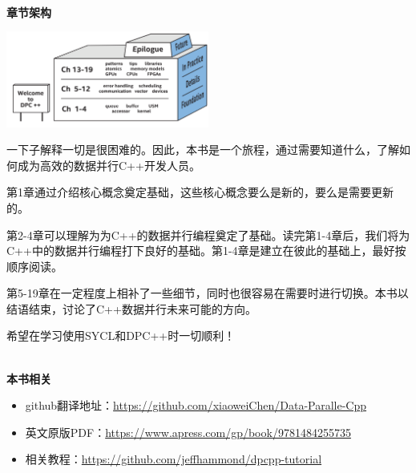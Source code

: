 \documentclass[11pt,a4paper,UTF8]{ctexart}
\begin{document}
	\hspace*{\fill} \\ %
	\noindent\textbf{章节架构}\ \par
	\begin{center}
		\includegraphics[width=0.5\textwidth]{images/struct-introduce}
	\end{center} \par
	一下子解释一切是很困难的。因此，本书是一个旅程，通过需要知道什么，了解如何成为高效的数据并行C++开发人员。\par
	
	第1章通过介绍核心概念奠定基础，这些核心概念要么是新的，要么是需要更新的。\par
	
	第2-4章可以理解为为C++的数据并行编程奠定了基础。读完第1-4章后，我们将为C++中的数据并行编程打下良好的基础。第1-4章是建立在彼此的基础上，最好按顺序阅读。\par
	
	第5-19章在一定程度上相补了一些细节，同时也很容易在需要时进行切换。本书以结语结束，讨论了C++数据并行未来可能的方向。\par
	
	希望在学习使用SYCL和DPC++时一切顺利！\par
	
	\hspace*{\fill} \\ %
	\noindent\textbf{本书相关}\ \par
	\begin{itemize}
		\item github翻译地址：\href{https://github.com/xiaoweiChen/Data-Paralle-Cpp}{https://github.com/xiaoweiChen/Data-Paralle-Cpp}
		\item 英文原版PDF：\href{https://www.apress.com/gp/book/9781484255735}{https://www.apress.com/gp/book/9781484255735}
		\item 相关教程：\href{https://github.com/jeffhammond/dpcpp-tutorial}{https://github.com/jeffhammond/dpcpp-tutorial}
	\end{itemize}
	\newpage
	
	\tableofcontents
	\newpage
	
	\pagestyle{empty}
	
\end{document}
